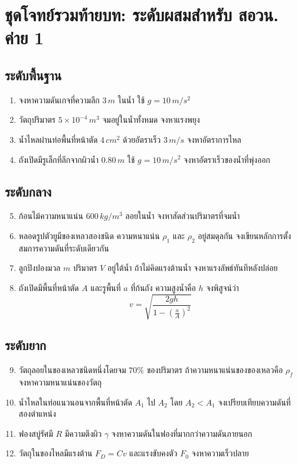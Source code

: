 \section{ชุดโจทย์รวมท้ายบท: ระดับผสมสำหรับ สอวน. ค่าย 1}

\subsection*{ระดับพื้นฐาน}

\begin{enumerate}
    \item จงหาความดันเกจที่ความลึก $3\,\si{m}$ ในน้ำ ใช้ $g=10\,\si{m/s^2}$
    \item วัตถุปริมาตร $5\times 10^{-4}\,\si{m^3}$ จมอยู่ในน้ำทั้งหมด จงหาแรงพยุง
    \item น้ำไหลผ่านท่อพื้นที่หน้าตัด $4\,\si{cm^2}$ ด้วยอัตราเร็ว $3\,\si{m/s}$ จงหาอัตราการไหล
    \item ถังเปิดมีรูเล็กที่ลึกจากผิวน้ำ $0.80\,\si{m}$ ใช้ $g=10\,\si{m/s^2}$ จงหาอัตราเร็วของน้ำที่พุ่งออก
\end{enumerate}

\subsection*{ระดับกลาง}

\begin{enumerate}
    \setcounter{enumi}{4}
    \item ก้อนไม้ความหนาแน่น $600\,\si{kg/m^3}$ ลอยในน้ำ จงหาสัดส่วนปริมาตรที่จมน้ำ
    \item หลอดรูปตัวยูมีของเหลวสองชนิด ความหนาแน่น $\rho_1$ และ $\rho_2$ อยู่สมดุลกัน จงเขียนหลักการตั้งสมการความดันที่ระดับเดียวกัน
    \item ลูกปิงปองมวล $m$ ปริมาตร $V$ อยู่ใต้น้ำ ถ้าไม่คิดแรงต้านน้ำ จงหาแรงลัพธ์ทันทีหลังปล่อย
    \item ถังเปิดมีพื้นที่หน้าตัด $A$ และรูพื้นที่ $a$ ที่ก้นถัง ความสูงน้ำคือ $h$ จงพิสูจน์ว่า
    \[
    v=
    \sqrt{
    \frac{2gh}{1-\left(\frac{a}{A}\right)^2}
    }
    \]
\end{enumerate}

\subsection*{ระดับยาก}

\begin{enumerate}
    \setcounter{enumi}{8}
    \item วัตถุลอยในของเหลวชนิดหนึ่งโดยจม $70\%$ ของปริมาตร ถ้าความหนาแน่นของของเหลวคือ $\rho_f$ จงหาความหนาแน่นของวัตถุ
    \item น้ำไหลในท่อแนวนอนจากพื้นที่หน้าตัด $A_1$ ไป $A_2$ โดย $A_2<A_1$ จงเปรียบเทียบความดันที่สองตำแหน่ง
    \item ฟองสบู่รัศมี $R$ มีความตึงผิว $\gamma$ จงหาความดันในฟองที่มากกว่าความดันภายนอก
    \item วัตถุในของไหลมีแรงต้าน $F_D=Cv$ และแรงขับคงตัว $F_0$ จงหาความเร็วปลาย
\end{enumerate}


